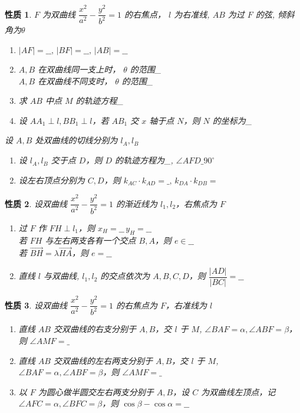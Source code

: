 \documentclass[a4paper,10pt,twoside]{article}
\newtheorem{proposition}{性质}
\begin{document}
\begin{proposition}
    $ F  $ 为双曲线 $ \dfrac{x^2}{a^2}-\dfrac{y^2}{b^2}=1  $ 的右焦点， $ l  $ 为右准线, $ AB  $ 为过 $ F  $ 的弦, 倾斜角为$ \theta  $ 
    \begin{enumerate}[ $ (1) $ ]
       \item  $ |AF|=\_\_,\,|BF|=\_\_,\,|AB|=\_\_ $
       \item   $ A,B  $ 在双曲线同一支上时， $ \theta  $ 的范围\_\\ $ A,B  $ 在双曲线不同支时， $ \theta  $ 的范围\_
       \item 求 $ AB  $ 中点 $ M  $ 的轨迹方程\_
       \item 设 $ AA_1\perp l,BB_1\perp l  $，若 $ AB_1  $ 交 $ x  $ 轴于点 $ N  $，则 $ N  $ 的坐标为\_  
    \end{enumerate}
    设 $ A,B  $ 处双曲线的切线分别为 $ l_A,l_B  $
    \begin{enumerate}
       \item[ $ (6 ) $ ] 设 $ l_A,l_B  $ 交于点 $ D  $，则 $ D  $ 的轨迹方程为\_, $ \angle AFD\_90^{\circ }$  
       \item[ $ (7 ) $ ] 设左右顶点分别为 $ C,D  $，则 $ k_{AC}\cdot k_{AD}=\_,\,k_{DA}\cdot k_{DB}= $ 
    \end{enumerate}
\end{proposition}
\begin{proposition}
    设双曲线 $ \dfrac{x^2}{a^2}-\dfrac{y^2}{b^2}=1  $ 的渐近线为 $ l_1,l_2 $，右焦点为 $ F  $ 
    \begin{enumerate}[ $ (1) $ ]
        \item 过 $ F  $ 作 $ FH\perp l_1  $，则 $ x_H =\_\_ \,y_H=\_\_ $\\若 $ FH  $ 与左右两支各有一个交点 $ B,A  $，则 $ e\in\_\_ $\\若 $ \vec{BH}=\lambda \vec{HA } $，则 $ e=\_\_ $ 
        \item 直线 $ l  $ 与双曲线, $ l_1,l_2 $ 的交点依次为 $ A,B,C,D  $，则 $ \dfrac{|AD|}{|BC|}=\_\_  $    
    \end{enumerate}
\end{proposition}
\begin{proposition}
    设双曲线 $ \dfrac{x^2}{a^2}-\dfrac{y^2}{b^2}=1  $ 的右焦点为 $ F  $，右准线为 $ l  $
    \begin{enumerate}[ $ (1) $ ]
        \item 直线 $ AB  $ 交双曲线的右支分别于 $ A,B  $，交 $ l  $ 于  $ M  $,  $ \angle BAF =\alpha ,\angle ABF=\beta  $，则 $ \angle AMF=\_ $
        \item 直线 $ AB  $ 交双曲线的左右两支分别于 $ A,B  $，交 $ l  $ 于 $ M  $, $ \angle BAF =\alpha ,\angle ABF=\beta$，则 $ \angle AMF=\_ $
        \item 以 $ F  $ 为圆心做半圆交左右两支分别于 $ A,B  $，设 $ C  $ 为双曲线左顶点，记 $ \angle AFC=\alpha,\angle BFC=\beta $，则 $ \cos \beta -\cos \alpha =\_\_ $  
    \end{enumerate} 
\end{proposition}
\end{document}
